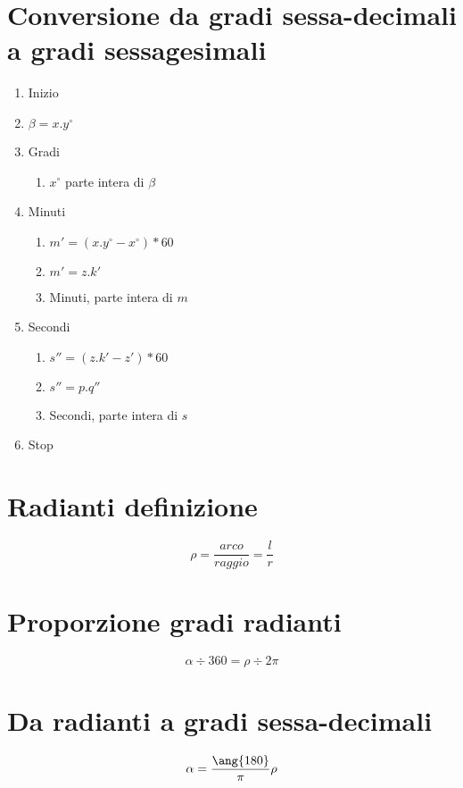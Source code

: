 \section{Conversione da gradi sessa-decimali a gradi sessagesimali}
\begin{enumerate}
	\item Inizio
	\item $\beta=x.y^\circ$
	\item Gradi 
	\begin{enumerate}
		\item $x^\circ$ parte intera di $\beta$ 
	\end{enumerate}
	\item Minuti 
	\begin{enumerate}
		\item 	$m'=(x.y^\circ-x^\circ)*60$
		\item   $m'=z.k'$
		\item   Minuti, parte intera di $m$
	\end{enumerate}
	\item Secondi	
	\begin{enumerate}
		\item $s''=(z.k'-z')*60$ 
		\item $s''=p.q''$
		\item Secondi, parte intera di $s$ 
	\end{enumerate}
	\item Stop
\end{enumerate}
\section{Radianti definizione}
{\centering
	
\par}
\begin{equation*}
\rho=\dfrac{arco}{raggio}=\dfrac{l}{r}
\end{equation*}
\section{Proporzione gradi radianti}
\begin{equation*}
\alpha\div 360=\rho\div 2\pi
\end{equation*}
\section{Da radianti a gradi sessa-decimali}
\begin{equation*}\index{Angoli!conversione!radianti gradi}
\alpha=\dfrac{\ang{180}}{\pi}\rho
\end{equation*}
